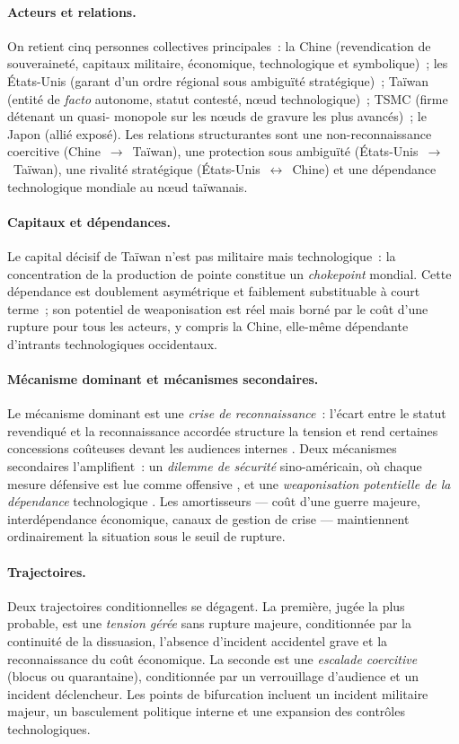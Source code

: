 \documentclass[11pt,a4paper]{article}
\begin{document}
\paragraph{Acteurs et relations.} On retient cinq personnes collectives principales~: la Chine
(revendication de souveraineté, capitaux militaire, économique, technologique et symbolique)~;
les États-Unis (garant d'un ordre régional sous ambiguïté stratégique)~; Taïwan (entité de
\emph{facto} autonome, statut contesté, nœud technologique)~; TSMC (firme détenant un quasi-
monopole sur les nœuds de gravure les plus avancés)~; le Japon (allié exposé). Les relations
structurantes sont une non-reconnaissance coercitive (Chine~$\rightarrow$~Taïwan), une protection
sous ambiguïté (États-Unis~$\rightarrow$~Taïwan), une rivalité stratégique (États-Unis~$\leftrightarrow$~Chine)
et une dépendance technologique mondiale au nœud taïwanais.

\paragraph{Capitaux et dépendances.} Le capital décisif de Taïwan n'est pas militaire mais
technologique~: la concentration de la production de pointe constitue un \emph{chokepoint}
mondial. Cette dépendance est doublement asymétrique et faiblement substituable à court terme~;
son potentiel de weaponisation est réel mais borné par le coût d'une rupture pour tous les
acteurs, y compris la Chine, elle-même dépendante d'intrants technologiques occidentaux.

\paragraph{Mécanisme dominant et mécanismes secondaires.} Le mécanisme dominant est une
\emph{crise de reconnaissance}~: l'écart entre le statut revendiqué et la reconnaissance
accordée structure la tension et rend certaines concessions coûteuses devant les audiences
internes \autocite{ringmar1996}. Deux mécanismes secondaires l'amplifient~: un \emph{dilemme de
sécurité} sino-américain, où chaque mesure défensive est lue comme offensive
\autocite{jervis1976}, et une \emph{weaponisation potentielle de la dépendance} technologique
\autocite{farrellNewman2019}. Les amortisseurs --- coût d'une guerre majeure, interdépendance
économique, canaux de gestion de crise --- maintiennent ordinairement la situation sous le seuil
de rupture.

\paragraph{Trajectoires.} Deux trajectoires conditionnelles se dégagent. La première, jugée la
plus probable, est une \emph{tension gérée} sans rupture majeure, conditionnée par la continuité
de la dissuasion, l'absence d'incident accidentel grave et la reconnaissance du coût économique.
La seconde est une \emph{escalade coercitive} (blocus ou quarantaine), conditionnée par un
verrouillage d'audience et un incident déclencheur. Les points de bifurcation incluent un
incident militaire majeur, un basculement politique interne et une expansion des contrôles
technologiques.
\end{document}
